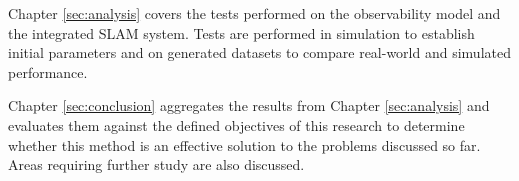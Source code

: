Chapter \ref{sec:analysis} covers the tests performed on the observability model and the integrated SLAM system. Tests are performed in simulation to establish initial parameters and on generated datasets to compare real-world and simulated performance.

Chapter \ref{sec:conclusion} aggregates the results from Chapter \ref{sec:analysis} and evaluates them against the defined objectives of this research to determine whether this method is an effective solution to the problems discussed so far. Areas requiring further study are also discussed.
